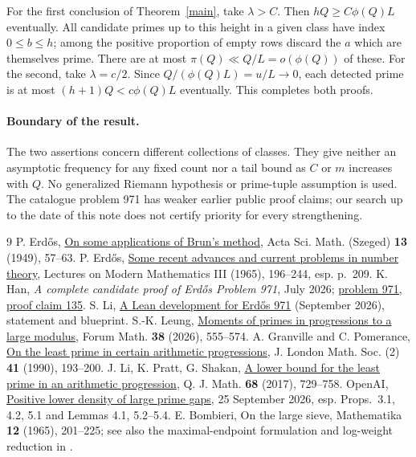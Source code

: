 \documentclass[11pt]{article}
\begin{document}
For the first conclusion of Theorem~\ref{main}, take $\lambda>C$.
Then $hQ\ge C\phi(Q)L$ eventually. All candidate primes up to this
height in a given class have index $0\le b\le h$; among the positive
proportion of empty rows discard the $a$ which are themselves prime.
There are at most $\pi(Q)\ll Q/L=o(\phi(Q))$ of these. For the second,
take $\lambda=c/2$. Since $Q/(\phi(Q)L)=u/L\to0$, each detected prime
is at most $(h+1)Q<c\phi(Q)L$ eventually. This completes both proofs.

\paragraph{Boundary of the result.}
The two assertions concern different collections of classes.
They give neither an asymptotic frequency for any fixed count nor
a tail bound as $C$ or $m$ increases with $Q$. No generalized
Riemann hypothesis or prime-tuple assumption is used. The catalogue problem
971 has weaker earlier public proof claims; our search up to the date
of this note does not certify priority for every strengthening.

\begin{thebibliography}{9}
 P. Erd\H os, \href{https://www.renyi.hu/~p_erdos/1949-05.pdf}{On some applications of Brun's method}, Acta Sci. Math. (Szeged) \textbf{13} (1949), 57--63.
 P. Erd\H os, \href{https://www.renyi.hu/~p_erdos/1965-17.pdf}{Some recent advances and current problems in number theory}, Lectures on Modern Mathematics III (1965), 196--244, esp. p.~209.
 K. Han, \emph{A complete candidate proof of Erd\H os Problem 971}, July 2026; \href{https://www.erdosproblems.com/971}{problem 971, proof claim 135}.
 S. Li, \href{https://github.com/daizisheng/erdos-971-lean}{A Lean development for Erd\H os 971} (September 2026), statement and blueprint.
 S.-K. Leung, \href{https://doi.org/10.1515/forum-2024-0292}{Moments of primes in progressions to a large modulus}, Forum Math. \textbf{38} (2026), 555--574.
 A. Granville and C. Pomerance,
\href{https://math.dartmouth.edu/~carlp/least.pdf}{On the least prime in certain arithmetic progressions}, J. London Math. Soc. (2) \textbf{41} (1990), 193--200.
 J. Li, K. Pratt, G. Shakan,
\href{https://arxiv.org/abs/1607.02543}{A lower bound for the least prime in an arithmetic progression}, Q. J. Math. \textbf{68} (2017), 729--758.
 OpenAI,
\href{https://github.com/openai/math/tree/main/preprints/Positive-lower-density-of-large-prime-gaps-September-25-2026}{Positive lower density of large prime gaps}, 25 September 2026, esp. Props.~3.1, 4.2, 5.1 and Lemmas 4.1, 5.2--5.4.
 E. Bombieri, On the large sieve, Mathematika \textbf{12} (1965), 201--225; see also the maximal-endpoint formulation and log-weight reduction in \cite[Lemma~5.2]{OAI}.
\end{thebibliography}
\end{document}
